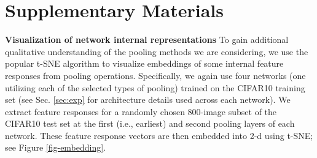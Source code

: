 \documentclass[twoside]{article}
\begin{document}
{
\footnotesize


}

\clearpage
\setcounter{section}{0}
\renewcommand{\thesection}{A\arabic{section}}
\setcounter{table}{0}
\renewcommand{\thetable}{A\arabic{table}}
\setcounter{figure}{0}
\renewcommand{\thefigure}{A\arabic{figure}}


\section{Supplementary Materials}

\textbf{Visualization of network internal representations}
To gain additional qualitative understanding of the pooling methods we are considering,
we use the popular t-SNE \cite{vandermaaten2008visualizing} algorithm to visualize 
embeddings of some internal feature responses from pooling operations. Specifically,
we again use four networks (one utilizing each of the selected types of pooling) trained on the CIFAR10
training set (see Sec. \ref{sec:exp} for architecture details used across each network).
We extract feature responses for a randomly chosen $800$-image subset of the CIFAR10 
test set at the first (i.e., earliest) and second pooling layers of each network.  These 
feature response vectors are then embedded into 2-d using t-SNE; see Figure \ref{fig-embedding}. 
\end{document}
